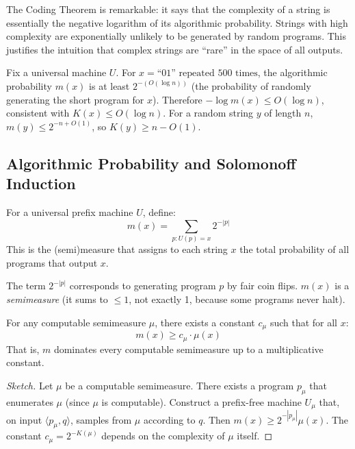 The Coding Theorem is remarkable: it says that the complexity of a string is essentially the negative logarithm of its algorithmic probability. Strings with high complexity are exponentially unlikely to be generated by random programs. This justifies the intuition that complex strings are ``rare'' in the space of all outputs.

\begin{example}
Fix a universal machine $U$. For $x = \text{``01'' repeated 500 times}$, the algorithmic probability $m(x)$ is at least $2^{-(O(\log n))}$ (the probability of randomly generating the short program for $x$). Therefore $-\log m(x) \le O(\log n)$, consistent with $K(x) \le O(\log n)$. For a random string $y$ of length $n$, $m(y) \le 2^{-n + O(1)}$, so $K(y) \ge n - O(1)$.
\end{example}

\subsection{Algorithmic Probability and Solomonoff Induction}
\label{sec:kolmogorov:prob}

\begin{definition}
For a universal prefix machine $U$, define:
\[
m(x) = \sum_{p: U(p) = x} 2^{-|p|}
\]
This is the (semi)measure that assigns to each string $x$ the total probability of all programs that output $x$.
\end{definition}

The term $2^{-|p|}$ corresponds to generating program $p$ by fair coin flips. $m(x)$ is a \emph{semimeasure} (it sums to $\le 1$, not exactly 1, because some programs never halt).

\begin{theorem}[Universality of $m$]
For any computable semimeasure $\mu$, there exists a constant $c_\mu$ such that for all $x$:
\[
m(x) \ge c_\mu \cdot \mu(x)
\]
That is, $m$ dominates every computable semimeasure up to a multiplicative constant.
\end{theorem}

\begin{proof}[Sketch]
Let $\mu$ be a computable semimeasure. There exists a program $p_\mu$ that enumerates $\mu$ (since $\mu$ is computable). Construct a prefix-free machine $U_\mu$ that, on input $\langle p_\mu, q \rangle$, samples from $\mu$ according to $q$. Then $m(x) \ge 2^{-|p_\mu|} \mu(x)$. The constant $c_\mu = 2^{-K(\mu)}$ depends on the complexity of $\mu$ itself.
\end{proof}

